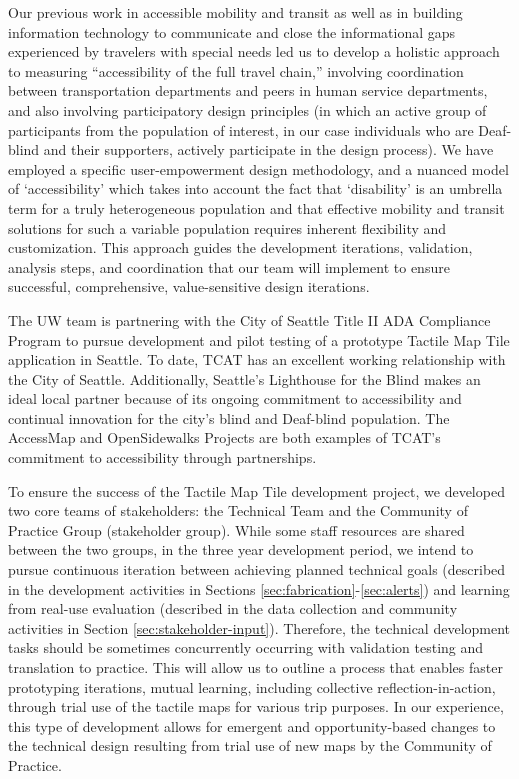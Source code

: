 Our previous work in accessible mobility and transit as well as in building information technology to communicate and close the informational gaps experienced by travelers with special needs led us to develop a holistic approach to measuring “accessibility of the full travel chain,” involving coordination between transportation departments and peers in human service departments, and also involving participatory design principles (in which an active group of participants from the population of interest, in our case individuals who are Deaf-blind and their supporters, actively participate in the design process). We have employed a specific user-empowerment design methodology, and a nuanced model of ‘accessibility’ which takes into account the fact that ‘disability’ is an umbrella term for a truly heterogeneous population and that effective mobility and transit solutions for such a variable population requires inherent flexibility and customization. This approach guides the development iterations, validation, analysis steps, and coordination that our team will implement to ensure successful, comprehensive, value-sensitive design iterations.

The UW team is partnering with the City of Seattle Title II ADA Compliance Program to pursue development and pilot testing of a prototype Tactile Map Tile application in Seattle. To date, TCAT has an excellent working relationship with the City of Seattle. Additionally, Seattle's Lighthouse for the Blind makes an ideal local partner because of its ongoing commitment to accessibility and continual innovation for the city's blind and Deaf-blind population. The AccessMap and OpenSidewalks Projects are both examples of TCAT's commitment to accessibility through partnerships. 

To ensure the success of the Tactile Map Tile development project, we developed two core teams of stakeholders: the Technical Team and the Community of Practice Group (stakeholder group). While some staff resources are shared between the two groups, in the three year development period, we intend to pursue continuous iteration between achieving planned technical goals (described in the development activities in Sections \ref{sec:fabrication}-\ref{sec:alerts}) and learning from real-use evaluation (described in the data collection and community activities in Section \ref{sec:stakeholder-input}).
Therefore, the technical development tasks should be sometimes concurrently occurring with validation testing and translation to practice. This will allow us to outline a process that enables  faster prototyping iterations, mutual learning, including collective reflection-in-action, through trial use of the tactile maps for various trip purposes. In our experience, this type of development allows for emergent and opportunity-based changes to the technical design resulting from trial use of new maps by the Community of Practice. 

